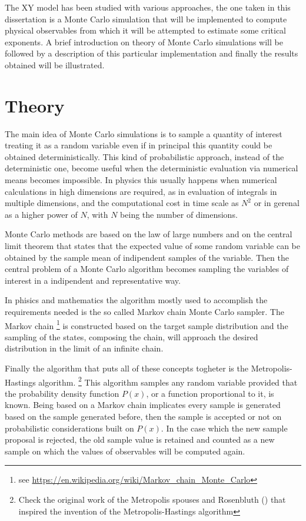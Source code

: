 The XY model has been studied with various approaches, the one taken in this
dissertation is a Monte Carlo simulation that will be implemented to compute
physical observables from which it will be attempted to estimate some critical
exponents. A brief introduction on theory of Monte Carlo simulations will be
followed by a description of this particular implementation and finally the 
results obtained will be illustrated.

\section{Theory}

The main idea of Monte Carlo simulations is to sample a quantity of interest
treating it as a random variable even if in principal this quantity could be
obtained deterministically. This kind of probabilistic approach, instead of the
deterministic one, become useful when the deterministic evaluation via numerical
means becomes impossible. In physics this usually happens when numerical 
calculations in high dimensions are required, as in evaluation of integrals in 
multiple dimensions, and the computational cost in time scale as $N^2$ or in 
gerenal as a higher power of $N$, with $N$ being the number of dimensions.

Monte Carlo methods are based on the law of large numbers and on the central limit
theorem that states that the expected value of some random variable can be obtained
by the sample mean of indipendent samples of the variable. Then the central problem
of a Monte Carlo algorithm becomes sampling the variables of interest in a
indipendent and representative way.

In phisics and mathematics the algorithm mostly used to accomplish the requirements
needed is the so called Markov chain Monte Carlo sampler. The Markov chain 
\footnote{see \url{https://en.wikipedia.org/wiki/Markov_chain_Monte_Carlo}} is 
constructed based on the target sample distribution and the sampling of the states,
composing the chain, will approach the desired distribution in the limit of an 
infinite chain.

Finally the algorithm that puts all of these concepts togheter is the
Metropolis-Hastings algorithm. \footnote{Check the original work of the Metropolis
spouses and Rosenbluth (\cite{Metropolis1953}) that inspired the invention of the
Metropolis-Hastings algorithm} This algorithm samples any random variable
provided that the probability density function $P(x)$, or a function proportional
to it, is known. Being  based on a Markov chain implicates every sample is generated
based on the sample generated before, then the sample is accepted or not on 
probabilistic considerations built on $P(x)$. In the case which the new sample proposal
is rejected, the old sample value is retained and counted as a new sample on which
the values of observables will be computed again.


